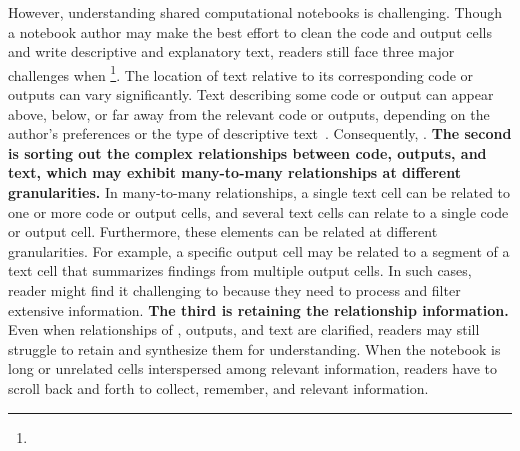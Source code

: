 However, understanding shared computational notebooks is challenging.
Though a notebook author may make the best effort to clean the code and output cells and write descriptive and explanatory text, readers still face three major challenges when \footnote{}.
The location of text relative to its corresponding code or outputs can vary significantly. 
Text describing some code or output can appear above, below, or far away from the relevant code or outputs, depending on the author's preferences or the type of descriptive text~\cite{wang2022documentation}.
Consequently, .
\textbf{The second is sorting out the complex relationships between code, outputs, and text, which may exhibit many-to-many relationships at different granularities.}
In many-to-many relationships, a single text cell can be related to one or more code or output cells, and several text cells can relate to a single code or output cell. 
Furthermore, these elements can be related at different granularities.
For example, a specific output cell may be related to a segment of a text cell that summarizes findings from multiple output cells.
In such cases, reader might find it challenging to  because they need to process and filter extensive information.
\textbf{The third is retaining  the relationship information.}
Even when relationships of , outputs, and text are clarified, readers may still struggle to retain and synthesize them for understanding.
When the notebook is long or  unrelated cells interspersed among relevant information, readers have to scroll back and forth to collect, remember, and  relevant information. 

